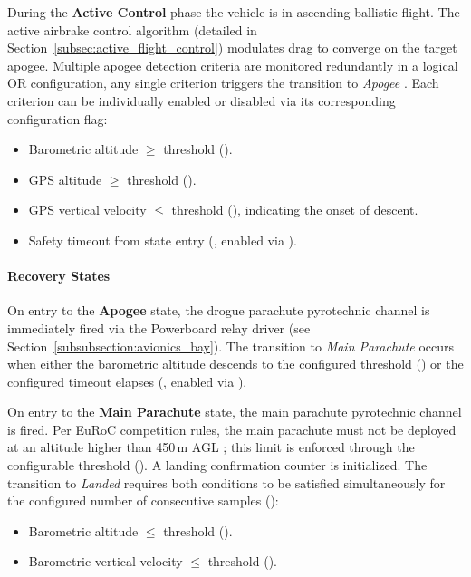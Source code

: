 During the \textbf{Active Control} phase the vehicle is in ascending ballistic flight. The active airbrake control algorithm (detailed in Section~\ref{subsec:active_flight_control}) modulates drag to converge on the target apogee. Multiple apogee detection criteria are monitored redundantly in a logical OR configuration, any single criterion triggers the transition to \emph{Apogee} . Each criterion can be individually enabled or disabled via its corresponding configuration flag:
\begin{itemize}
    \item Barometric altitude $\geq$ threshold ().
    \item GPS altitude $\geq$ threshold ().
    \item GPS vertical velocity $\leq$ threshold (), indicating the onset of descent.
    \item Safety timeout from state entry (, enabled via ).
\end{itemize}

\paragraph{Recovery States}

On entry to the \textbf{Apogee} state, the drogue parachute pyrotechnic channel is immediately fired via the Powerboard relay driver (see Section~\ref{subsubsection:avionics_bay}). The transition to \emph{Main Parachute} occurs when either the barometric altitude descends to the configured threshold () or the configured timeout elapses (, enabled via ).

On entry to the \textbf{Main Parachute} state, the main parachute pyrotechnic channel is fired. Per EuRoC competition rules, the main parachute must not be deployed at an altitude higher than 450\,m AGL ; this limit is enforced through the configurable threshold (). A landing confirmation counter is initialized. The transition to \emph{Landed} requires both conditions to be satisfied simultaneously for the configured number of consecutive samples ():
\begin{itemize}
    \item Barometric altitude $\leq$ threshold ().
    \item Barometric vertical velocity $\leq$ threshold ().
\end{itemize}


